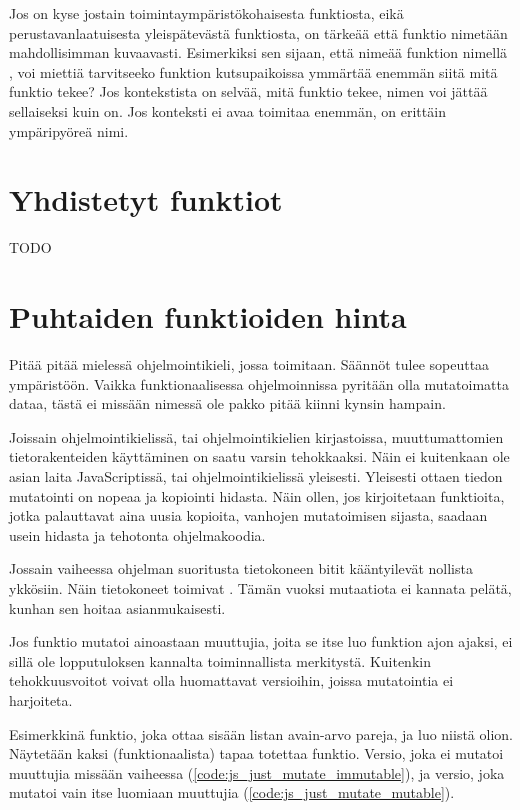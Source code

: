 Jos on kyse jostain toimintaympäristökohaisesta funktiosta, eikä perustavanlaatuisesta yleispätevästä funktiosta, on tärkeää että funktio nimetään mahdollisimman kuvaavasti. Esimerkiksi sen sijaan, että nimeää funktion nimellä \textcite{processUsers}, voi miettiä tarvitseeko funktion kutsupaikoissa ymmärtää enemmän siitä mitä funktio tekee? Jos kontekstista on selvää, mitä funktio tekee, nimen voi jättää sellaiseksi kuin on. Jos konteksti ei avaa toimitaa enemmän, \textcite{processUsers} on erittäin ympäripyöreä nimi.

\section{Yhdistetyt funktiot}

TODO

\section{Puhtaiden funktioiden hinta}

Pitää pitää mielessä ohjelmointikieli, jossa toimitaan. Säännöt tulee sopeuttaa ympäristöön. Vaikka funktionaalisessa ohjelmoinnissa pyritään olla mutatoimatta dataa, tästä ei missään nimessä ole pakko pitää kiinni kynsin hampain.

Joissain ohjelmointikielissä, tai ohjelmointikielien kirjastoissa, muuttumattomien tietorakenteiden käyttäminen on saatu varsin tehokkaaksi. Näin ei kuitenkaan ole asian laita JavaScriptissä, tai ohjelmointikielissä yleisesti. Yleisesti ottaen tiedon mutatointi on nopeaa ja kopiointi hidasta. Näin ollen, jos kirjoitetaan funktioita, jotka palauttavat aina uusia kopioita, vanhojen mutatoimisen sijasta, saadaan usein hidasta ja tehotonta ohjelmakoodia.

Jossain vaiheessa ohjelman suoritusta tietokoneen bitit kääntyilevät nollista ykkösiin. Näin tietokoneet toimivat \cite{is_reduce_bad}. Tämän vuoksi mutaatiota ei kannata pelätä, kunhan sen hoitaa asianmukaisesti.

Jos funktio mutatoi ainoastaan muuttujia, joita se itse luo funktion ajon ajaksi, ei sillä ole lopputuloksen kannalta toiminnallista merkitystä. Kuitenkin tehokkuusvoitot voivat olla huomattavat versioihin, joissa mutatointia ei harjoiteta.

Esimerkkinä funktio, joka ottaa sisään listan avain-arvo pareja, ja luo niistä olion. Näytetään kaksi (funktionaalista) tapaa totettaa funktio.
Versio, joka ei mutatoi muuttujia missään vaiheessa (\ref{code:js_just_mutate_immutable}), ja versio, joka mutatoi vain itse luomiaan muuttujia (\ref{code:js_just_mutate_mutable}).

